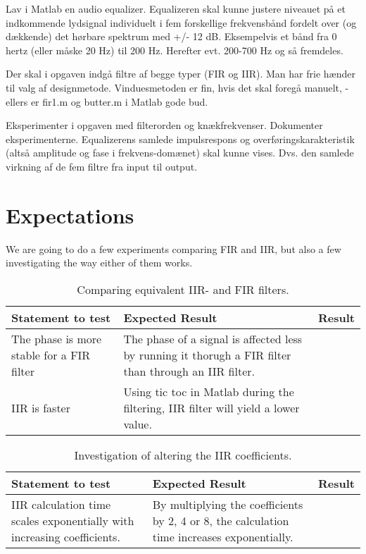 Lav i Matlab en audio equalizer. Equalizeren skal kunne justere niveauet på et indkommende lydsignal individuelt i fem forskellige frekvensbånd fordelt over (og dækkende) det hørbare spektrum med +/- 12 dB. Eksempelvis et bånd fra 0 hertz (eller måske 20 Hz) til 200 Hz. Herefter evt. 200-700 Hz og så fremdeles.

Der skal i opgaven indgå filtre af begge typer (FIR og IIR). Man har frie hænder til valg af designmetode. Vinduesmetoden er fin, hvis det skal foregå manuelt, - ellers er fir1.m og butter.m i Matlab gode bud.

Eksperimenter i opgaven med filterorden og knækfrekvenser. Dokumenter eksperimenterne. Equalizerens samlede impulsrespons og overføringskarakteristik (altså amplitude og fase i frekvens-domænet) skal kunne vises. Dvs. den samlede virkning af de fem filtre fra input til output.

\section{Expectations}
\label{sec:expectations}
We are going to do a few experiments comparing FIR and IIR, but also a few investigating the way either of them works.

\begin{table}
	\caption{Comparing equivalent IIR- and FIR filters.}
	\label{tab:IIRvsFIR}
	\begin{tabularx}{\textwidth}{X X X}
		Statement to test	& Expected Result	& Result \\
		\toprule
		The phase is more stable for a FIR filter & The phase of a signal is affected less by running it thorugh a FIR filter than through an IIR filter. & \\
		IIR is faster		& Using tic toc in Matlab during the filtering, IIR filter will yield a lower value. & \\
	\end{tabularx}
\end{table}

\begin{table}
	\caption{Investigation of altering the IIR coefficients.}
	\label{tab:IIRtest}
	\begin{tabularx}{\textwidth}{X X X}
		Statement to test	& Expected Result	& Result \\
		\toprule
		IIR calculation time scales exponentially with increasing coefficients. & By multiplying the coefficients by 2, 4 or 8, the calculation time increases exponentially. & \\
	\end{tabularx}
\end{table}